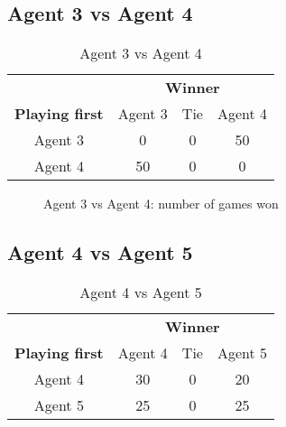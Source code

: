 \subsection{Agent 3 vs Agent 4}

\begin{table}[!h]
	\centering
	\label{result:Ag3vsAg4}
	\begin{tabular}{c | c | c | c}
		& \multicolumn{3}{c}{\textbf{Winner}}        \\
		\textbf{Playing first} & Agent 3 & Tie & Agent 4 \\ \hline
		Agent 3 & 0 & 0 & 50 \\ \hline
		Agent 4 & 50 & 0 & 0
	\end{tabular}
	\caption{Agent 3 vs Agent 4}
\end{table}

\begin{figure}[!h]
	\centering
	\caption{Agent 3 vs Agent 4: number of games won}
\end{figure}

\subsection{Agent 4 vs Agent 5}

\begin{table}[!h]
	\centering
	\label{result:Ag4vsAg5}
	\begin{tabular}{c | c | c | c}
		& \multicolumn{3}{c}{\textbf{Winner}}        \\
		\textbf{Playing first} & Agent 4 & Tie & Agent 5 \\ \hline
		Agent 4 & 30 & 0 & 20 \\ \hline
		Agent 5 & 25 & 0 & 25
	\end{tabular}
	\caption{Agent 4 vs Agent 5}
\end{table}

